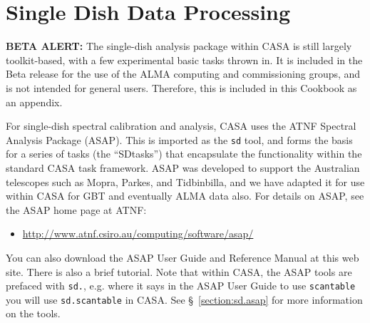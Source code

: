 

\chapter[Appendix: Single Dish Data Processing]{Single Dish Data Processing}
\label{chapter:sd}



{\bf BETA ALERT:} The single-dish analysis package within CASA
is still largely toolkit-based, with a few experimental basic
tasks thrown in.  It is included in the Beta release for the use
of the ALMA computing and commissioning groups, and is not intended
for general users.  Therefore, this is included in this Cookbook
as an appendix.

For single-dish spectral calibration and analysis, 
CASA uses the ATNF Spectral Analysis Package (ASAP).  This is
imported as the {\tt sd} tool, and forms the basis for a series
of tasks (the ``SDtasks'') that encapsulate the functionality
within the standard CASA task framework.  ASAP was developed to
support the Australian telescopes such as Mopra, Parkes, and
Tidbinbilla, and we have adapted it for use within CASA for
GBT and eventually ALMA data also.  For details on ASAP, see
the ASAP home page at ATNF: 
\begin{itemize}
   \item \url{http://www.atnf.csiro.au/computing/software/asap/}
\end{itemize}
You can also download the ASAP User Guide and Reference Manual at this
web site.  There is also a brief tutorial.  Note that within CASA,
the ASAP tools are prefaced with {\tt sd.}, e.g. where it
says in the ASAP User Guide to use {\tt scantable} you will use
{\tt sd.scantable} in CASA.  See \S~\ref{section:sd.asap} for more
information on the tools.

